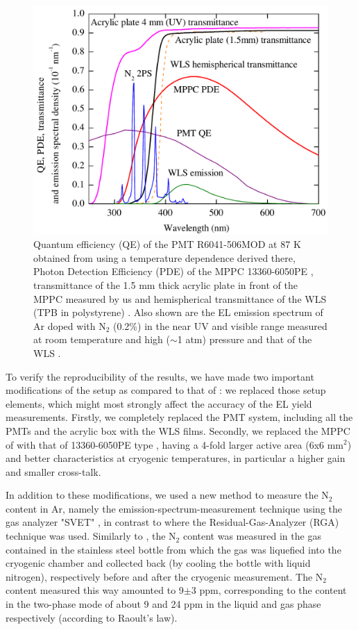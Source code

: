 \documentclass[a4paper,11pt]{article}
\begin{document}
\begin{figure}[hbt]
	\centering
	\includegraphics[width=0.6\columnwidth,keepaspectratio]{fig2}
	\caption{Quantum efficiency (QE) of the PMT R6041-506MOD at 87 K obtained from \cite{Hamamatsu,PMTQE} using a temperature dependence derived there, Photon Detection Efficiency (PDE) of the MPPC 13360-6050PE \cite{CryoMPPC15,Hamamatsu}, transmittance of the 1.5 mm thick acrylic plate in front of the MPPC measured by us  and hemispherical transmittance of the WLS (TPB in polystyrene) \cite{TPB2}. Also shown are the EL emission spectrum of Ar doped with N$_2$ (0.2\%) in the near UV and visible range measured at room temperature and high ($ \sim $1 atm) pressure \cite{Takahashi83} and that of the WLS \cite{TPB1}.}
	\label{QEPDE}
\end{figure}

To verify the reproducibility of the results, we have made two important modifications of the setup as compared to that of \cite{CRADPropEL15,CRADELGap17}: we replaced those setup elements, which might most strongly affect the accuracy of the EL yield measurements. Firstly,  we completely replaced the PMT system, including all the PMTs and the acrylic box with the WLS films. Secondly, we replaced the MPPC of \cite{CRADPropEL15,CRADELGap17} with that of 13360-6050PE type \cite{Hamamatsu}, having a 4-fold larger active area (6x6 mm$^2$) and better characteristics at cryogenic temperatures, in particular a higher gain and smaller cross-talk.

In addition to these modifications, we used a new method to measure the N$_2$ content in Ar, namely the emission-spectrum-measurement technique using the gas analyzer "SVET" \cite{SVET}, in contrast to \cite{CRADPropEL15,CRADELGap17} where the Residual-Gas-Analyzer (RGA) technique was used. Similarly to \cite{CRADPropEL15,CRADELGap17}, the N$_2$ content was measured in the gas contained in the stainless steel bottle from which the gas was liquefied into the cryogenic chamber and collected back (by cooling the bottle with liquid nitrogen),  respectively before and after the cryogenic measurement. The N$_2$ content measured this way amounted to 9$\pm$3 ppm, corresponding to the content in the two-phase mode of about 9 and 24 ppm in the liquid and gas phase respectively (according to Raoult's law).
\end{document}
